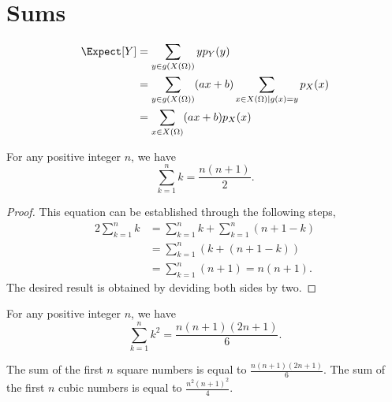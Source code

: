 \chapter{Sums}

\begin{equation*}
\begin{split}
\Expect [Y] &= \sum_{y \in g(X(\Omega))} y p_Y(y) \\
&= \sum_{y \in g(X(\Omega))} (ax + b) \sum_{x \in X(\Omega) | g(x) = y} p_X(x) \\
&= \sum_{x \in X(\Omega)} (ax + b) p_X(x)
\end{split}
\end{equation*}


\begin{proposition}
For any positive integer $n$, we have
\begin{equation*}
\sum_{k=1}^n k = \frac{n (n+1)}{2} .
\end{equation*}
\end{proposition}
\begin{proof}
This equation can be established through the following steps,
\begin{equation*}
\begin{split}
2 \sum_{k=1}^n k
&= \sum_{k=1}^n k + \sum_{k=1}^n (n + 1 - k) \\
&= \sum_{k=1}^n \left( k + (n + 1 - k) \right) \\
&= \sum_{k=1}^n (n + 1)
= n (n+1) .
\end{split}
\end{equation*}
The desired result is obtained by deviding both sides by two.
\end{proof}

\begin{proposition}
For any positive integer $n$, we have
\begin{equation*}
\sum_{k=1}^n k^2 = \frac{n (n+1) (2n+1)}{6} .
\end{equation*}
\end{proposition}

The sum of the first $n$ square numbers is equal to $\frac{n (n+1)(2n + 1)}{6}$.
The sum of the first $n$ cubic numbers is equal to $\frac{n^2 (n+1)^2}{4}$.

